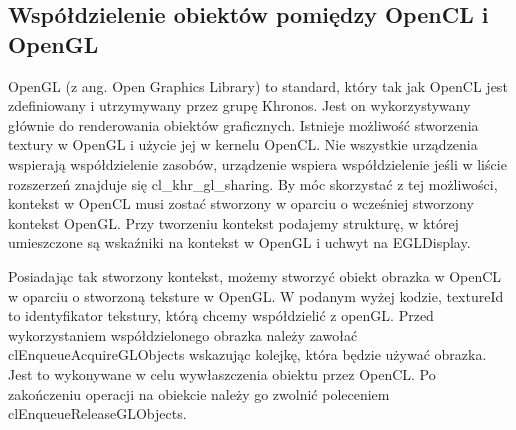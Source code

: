 \subsection [Współdzielenie obiektów pomiędzy OpenCL i OpenGL]{Współdzielenie obiektów pomiędzy OpenCL i OpenGL}
OpenGL (z ang. Open Graphics Library) to standard, który tak jak OpenCL jest zdefiniowany i utrzymywany przez grupę Khronos. Jest on wykorzystywany głównie do renderowania obiektów graficznych.
Istnieje możliwość stworzenia textury w OpenGL i użycie jej w kernelu OpenCL. Nie wszystkie urządzenia wspierają współdzielenie zasobów, urządzenie wspiera współdzielenie jeśli w liście rozszerzeń znajduje się cl\_khr\_gl\_sharing. By móc skorzystać z tej możliwości, kontekst w OpenCL musi zostać stworzony w oparciu o wcześniej stworzony kontekst OpenGL. Przy tworzeniu kontekst podajemy strukturę, w której umieszczone są wskaźniki na kontekst w OpenGL i uchwyt na EGLDisplay. 
 
 Posiadając tak stworzony kontekst, możemy stworzyć obiekt obrazka w OpenCL w oparciu o stworzoną teksture w OpenGL.
  W podanym wyżej kodzie, textureId to identyfikator tekstury, którą chcemy współdzielić z openGL. 
 Przed wykorzystaniem współdzielonego obrazka należy zawołać clEnqueueAcquireGLObjects wskazując kolejkę, która będzie używać obrazka. Jest to wykonywane w celu wywłaszczenia obiektu przez OpenCL. Po zakończeniu operacji na obiekcie należy go zwolnić poleceniem clEnqueueReleaseGLObjects.



